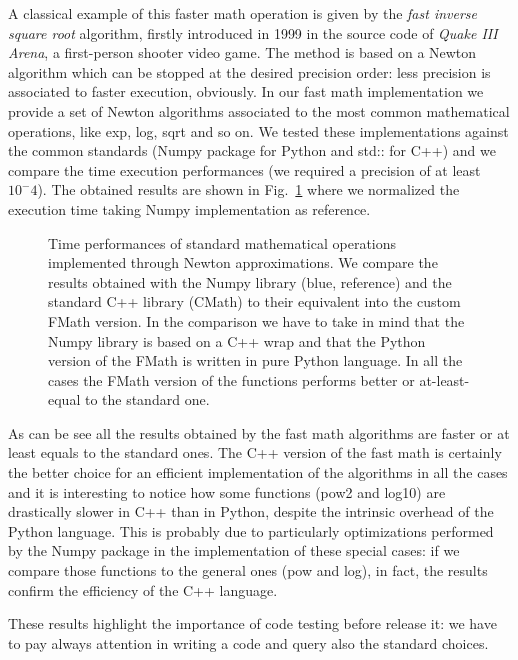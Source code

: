 \documentclass{standalone}
\begin{document}
A classical example of this faster math operation is given by the \emph{fast inverse square root} algorithm, firstly introduced in 1999 in the source code of \emph{Quake III Arena}, a first-person shooter video game.
The method is based on a Newton algorithm which can be stopped at the desired precision order: less precision is associated to faster execution, obviously.
In our \textsf{fast math} implementation we provide a set of Newton algorithms associated to the most common mathematical operations, like \textsf{exp}, \textsf{log}, \textsf{sqrt} and so on.
We tested these implementations against the common standards (\textsf{Numpy} package for Python and \textsf{std::} for \textsf{C++}) and we compare the time execution performances (we required a precision of at least $10^-4$).
The obtained results are shown in Fig.~\ref{fig:fmath} where we normalized the execution time taking \textsf{Numpy} implementation as reference.

\begin{figure}[htbp]
\centering
\def\svgwidth{0.8\textwidth}

\caption{Time performances of standard mathematical operations implemented through Newton approximations.
We compare the results obtained with the \textsf{Numpy} library (blue, reference) and the standard \textsf{C++} library (\textsf{CMath}) to their equivalent into the custom \textsf{FMath} version.
In the comparison we have to take in mind that the \textsf{Numpy} library is based on a \textsf{C++} wrap and that the \textsf{Python} version of the \textsf{FMath} is written in pure \textsf{Python} language.
In all the cases the \textsf{FMath} version of the functions performs better or at-least-equal to the standard one.
}
\label{fig:fmath}
\end{figure}

As can be see all the results obtained by the \textsf{fast math} algorithms are faster or at least equals to the standard ones.
The \textsf{C++} version of the \textsf{fast math} is certainly the better choice for an efficient implementation of the algorithms in all the cases and it is interesting to notice how some functions (\textsf{pow2} and \textsf{log10}) are drastically slower in \textsf{C++} than in \textsf{Python}, despite the intrinsic overhead of the \textsf{Python} language.
This is probably due to particularly optimizations performed by the \textsf{Numpy} package in the implementation of these special cases: if we compare those functions to the general ones (\textsf{pow} and \textsf{log}), in fact, the results confirm the efficiency of the \textsf{C++} language.

These results highlight the importance of code testing before release it: we have to pay always attention in writing a code and query also the standard choices.
\end{document}
